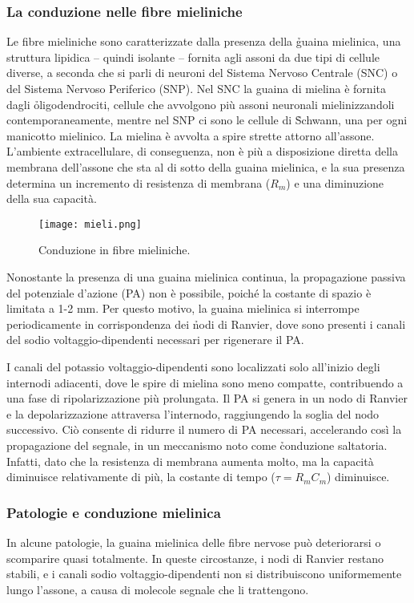 \subsubsection{La conduzione nelle fibre mieliniche}
Le fibre mieliniche sono caratterizzate dalla presenza della \h{guaina} mielinica, una struttura lipidica -- quindi isolante -- fornita agli assoni da due tipi di cellule diverse, a seconda che si parli di neuroni del Sistema Nervoso Centrale (SNC) o del Sistema Nervoso Periferico (SNP). Nel SNC la guaina di mielina è fornita dagli \h{oligodendrociti}, cellule che avvolgono più assoni neuronali mielinizzandoli contemporaneamente, mentre nel SNP ci sono le cellule di \h{Schwann}, una per ogni manicotto mielinico. La mielina è avvolta a spire strette attorno all’assone. L’ambiente extracellulare, di conseguenza, non è più a disposizione diretta della membrana dell’assone che sta al di sotto della guaina mielinica, e la sua presenza determina un incremento di resistenza di membrana ($R_m$) e una diminuzione della sua capacità.

\begin{figure}[h]
    \centering
    \texttt{[image: mieli.png]}
    \caption{Conduzione in fibre mieliniche.}
    \label{fig:mieli}
\end{figure}

Nonostante la presenza di una guaina mielinica continua, la propagazione passiva del potenziale d'azione (PA) non è possibile, poiché la costante di spazio è limitata a 1-2 mm. Per questo motivo, la guaina mielinica si interrompe periodicamente in corrispondenza dei \h{nodi di Ranvier}, dove sono presenti i canali del sodio voltaggio-dipendenti necessari per rigenerare il PA.

I canali del potassio voltaggio-dipendenti sono localizzati solo all'inizio degli internodi adiacenti, dove le spire di mielina sono meno compatte, contribuendo a una fase di ripolarizzazione più prolungata. Il PA si genera in un nodo di Ranvier e la depolarizzazione attraversa l’internodo, raggiungendo la soglia del nodo successivo. Ciò consente di ridurre il numero di PA necessari, accelerando così la propagazione del segnale, in un meccanismo noto come \h{conduzione saltatoria}. Infatti, dato che la resistenza di membrana aumenta molto, ma la capacità diminuisce relativamente di più, la costante di tempo ($\tau = R_m C_m$) diminuisce.

\subsubsection{Patologie e conduzione mielinica}
In alcune patologie, la guaina mielinica delle fibre nervose può deteriorarsi o scomparire quasi totalmente. In queste circostanze, i nodi di Ranvier restano stabili, e i canali sodio voltaggio-dipendenti non si distribuiscono uniformemente lungo l'assone, a causa di molecole segnale che li trattengono.

